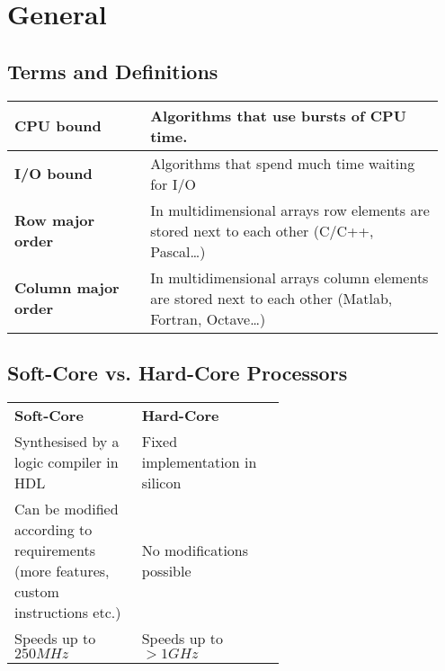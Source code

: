 \section{General}
	\subsection{Terms and Definitions}
		\begin{table}[H]
			\centering
			\begin{tabular}{|>{\bfseries}p{0.3\linewidth}|p{0.65\linewidth}|}
				 \hline
				 CPU bound
				 	& Algorithms that use bursts of CPU time.\\
				 \hline
				 I/O bound  
				 	& Algorithms that spend much time waiting for I/O\\
				 \hline		
				 Row major order  
				 	& In multidimensional arrays row elements are stored next to each other (C/C++, Pascal\ldots)\\
				 \hline
				 Column major order  
				 	& In multidimensional arrays column elements are stored next to each other (Matlab, Fortran, Octave\ldots)\\
				\hline
			\end{tabular}
		\end{table}
		
	\subsection{Soft-Core vs. Hard-Core Processors}
	
		\begin{table}[H]
			\centering
			\begin{tabular}{|p{0.3\linewidth}|p{0.3\linewidth}|}
				 \hline
				 \textbf{Soft-Core} 
				 	& \textbf{Hard-Core}\\
				 \hhline{|=|=|}
				 Synthesised by a logic compiler in HDL  
				 	& Fixed implementation in silicon\\
				 \hline
				 Can be modified according to requirements (more features, custom
				 instructions etc.)
				 	& No modifications possible\\
				 \hline
				 Speeds up to $250MHz$
				 	& Speeds up to $>1GHz$\\
				 \hline			
			\end{tabular}
		\end{table}
		
	